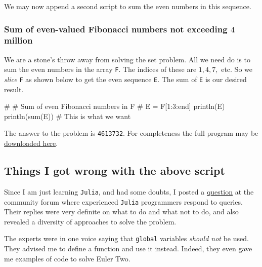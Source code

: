 \documentclass[
  a4paper,
]{article}
\newenvironment{Shaded}{\begin{snugshade}}{\end{snugshade}}
\newcommand{\CommentTok}[1]{\textcolor[rgb]{0.50,0.62,0.50}{#1}}
\newcommand{\FloatTok}[1]{\textcolor[rgb]{0.75,0.75,0.82}{#1}}
\newcommand{\FunctionTok}[1]{\textcolor[rgb]{0.94,0.94,0.56}{#1}}
\newcommand{\KeywordTok}[1]{\textcolor[rgb]{0.94,0.87,0.69}{#1}}
\newcommand{\NormalTok}[1]{\textcolor[rgb]{0.80,0.80,0.80}{#1}}
\newcommand{\OperatorTok}[1]{\textcolor[rgb]{0.94,0.94,0.82}{#1}}
\begin{document}
We may now append a second script to sum the even numbers in this
sequence.

\hypertarget{sum-of-even-valued-fibonacci-numbers-not-exceeding-4-million}{%
\subsubsection{\texorpdfstring{Sum of even-valued Fibonacci numbers not
exceeding \(4\)
million}{Sum of even-valued Fibonacci numbers not exceeding 4 million}}\label{sum-of-even-valued-fibonacci-numbers-not-exceeding-4-million}}

We are a stone's throw away from solving the set problem. All we need do
is to sum the even numbers in the array \texttt{F}. The indices of these
are \(1, 4, 7,\) etc. So we \emph{slice} \texttt{F} as shown below to
get the even sequence \texttt{E}. The sum of \texttt{E} is our desired
result.

\begin{Shaded}
\begin{Highlighting}[]
\CommentTok{\#}
\CommentTok{\# Sum of even Fibonacci numbers in F}
\CommentTok{\#}
\NormalTok{E }\OperatorTok{=}\NormalTok{ F[}\FloatTok{1}\OperatorTok{:}\FloatTok{3}\OperatorTok{:}\KeywordTok{end}\NormalTok{]}
\FunctionTok{println}\NormalTok{(E)}
\FunctionTok{println}\NormalTok{(}\FunctionTok{sum}\NormalTok{(E)) }\CommentTok{\# This is what we want}
\end{Highlighting}
\end{Shaded}

The answer to the problem is \texttt{4613732}. For completeness the full
program may be \href{auxiliary/even-sum.jl}{downloaded here}.

\hypertarget{things-i-got-wrong-with-the-above-script}{%
\subsection{Things I got wrong with the above
script}\label{things-i-got-wrong-with-the-above-script}}

Since I am just learning \texttt{Julia}, and had some doubts, I posted a
\href{https://discourse.julialang.org/t/is-it-possible-to-suppres-the-printing-of-any-before-an-array-is-printed/106930}{question}
at the community forum where experienced \texttt{Julia} programmers
respond to queries. Their replies were very definite on what to do and
what not to do, and also revealed a diversity of approaches to solve the
problem.

The experts were in one voice saying that \texttt{global} variables
\emph{should not} be used. They advised me to define a function and use
it instead. Indeed, they even gave me examples of code to solve Euler
Two.
\end{document}
